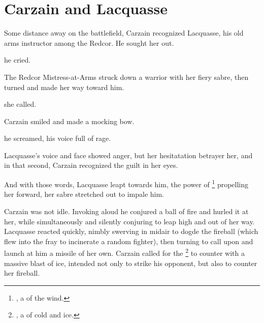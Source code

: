 \section{Carzain and Lacquasse}
Some distance away on the battlefield, Carzain recognized Lacquasse, his old arms instructor among the Redcor. He sought her out. 

 he cried.  

The Redcor Mistress-at-Arms struck down a \scathaese{} warrior with her fiery sabre, then turned and made her way toward him. 

 she called.  

 Carzain smiled and made a mocking bow.  


 he screamed, his voice full of rage.  



 Lacquasse's voice and face showed anger, but her hesitatation betrayer her, and in that second, Carzain recognized the guilt in her eyes. 


 And with those words, Lacquasse leapt towards him, the power of \Feazin{}\footnote{\Feazin{}, a \Sephirah{} of the wind.} propelling her forward, her sabre stretched out to impale him. 

Carzain was not idle. Invoking aloud  he conjured a ball of fire and hurled it at her, while simultaneously and silently conjuring \Feazin{} to leap high and out of her way. Lacquasse reacted quickly, nimbly swerving in midair to dogde the fireball (which flew into the fray to incinerate a random fighter), then turning to call upon \Izion{} and launch at him a missile of her own. Carzain called for the \Kliffah{} \Horvaleth{}\footnote{\Horvaleth{}, a \Kliffah{} of cold and ice.} to counter with a massive blast of ice, intended not only to strike his opponent, but also to counter her fireball. 

